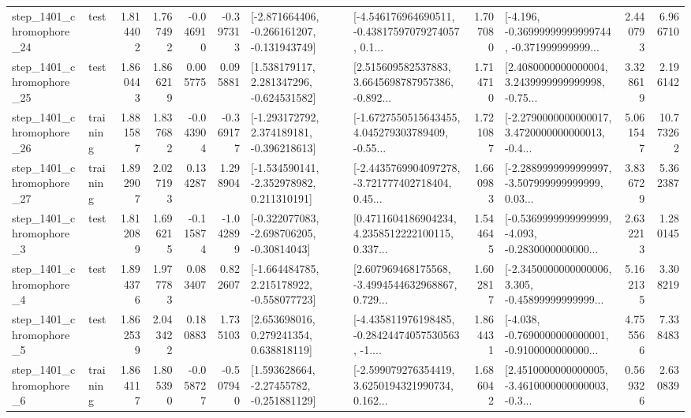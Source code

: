 \begin{tabular}{llrrrrllrlrr}
 step\_1401\_chromophore\_24 &      test &      1.814402 &    1.767492 &     -0.046910 & -0.397313 &  [-2.871664406, -0.266161207, -0.131943749] &  [-4.546176964690511, -0.43817597079274057, 0.1... &       1.707080 &  [-4.196, -0.36999999999999744, -0.371999999999... &            2.440793 &          6.966710 \\
 step\_1401\_chromophore\_25 &      test &      1.860443 &    1.866219 &      0.005775 &  0.095881 &    [1.538179117, 2.281347296, -0.624531582] &  [2.515609582537883, 3.6645698787957386, -0.892... &       1.714710 &  [2.4080000000000004, 3.2439999999999998, -0.75... &            3.328619 &          2.196142 \\
 step\_1401\_chromophore\_26 &  training &      1.881587 &    1.837682 &     -0.043904 & -0.369177 &   [-1.293172792, 2.374189181, -0.396218613] &  [-1.6727550515643455, 4.045279303789409, -0.55... &       1.721087 &  [-2.2790000000000017, 3.4720000000000013, -0.4... &            5.061547 &         10.773262 \\
 step\_1401\_chromophore\_27 &  training &      1.892907 &    2.027193 &      0.134287 &  1.298904 &   [-1.534590141, -2.352978982, 0.211310191] &  [-2.4435769904097278, -3.721777402718404, 0.45... &       1.660983 &  [-2.2889999999999997, -3.507999999999999, 0.03... &            3.836729 &          5.362387 \\
  step\_1401\_chromophore\_3 &      test &      1.812089 &    1.696215 &     -0.115874 & -1.042899 &   [-0.322077083, -2.698706205, -0.30814043] &  [0.4711604186904234, 4.2358512222100115, 0.337... &       1.544645 &  [-0.5369999999999999, -4.093, -0.2830000000000... &            2.632213 &          1.280145 \\
  step\_1401\_chromophore\_4 &      test &      1.894376 &    1.977783 &      0.083407 &  0.822607 &   [-1.664484785, 2.215178922, -0.558077723] &  [2.607969468175568, -3.4994544632968867, 0.729... &       1.602817 &  [-2.3450000000000006, 3.305, -0.45899999999999... &            5.162135 &          3.308219 \\
  step\_1401\_chromophore\_5 &      test &      1.862539 &    2.043422 &      0.180883 &  1.735103 &     [2.653698016, 0.279241354, 0.638818119] &  [-4.435811976198485, -0.28424474057530563, -1.... &       1.864431 &  [-4.038, -0.7690000000000001, -0.9100000000000... &            4.755566 &          7.338483 \\
  step\_1401\_chromophore\_6 &  training &      1.864117 &    1.805390 &     -0.058727 & -0.507940 &    [1.593628664, -2.27455782, -0.251881129] &  [-2.599079276354419, 3.6250194321990734, 0.162... &       1.686042 &  [2.4510000000000005, -3.4610000000000003, -0.3... &            0.569326 &          2.630839 \\

\end{tabular}
